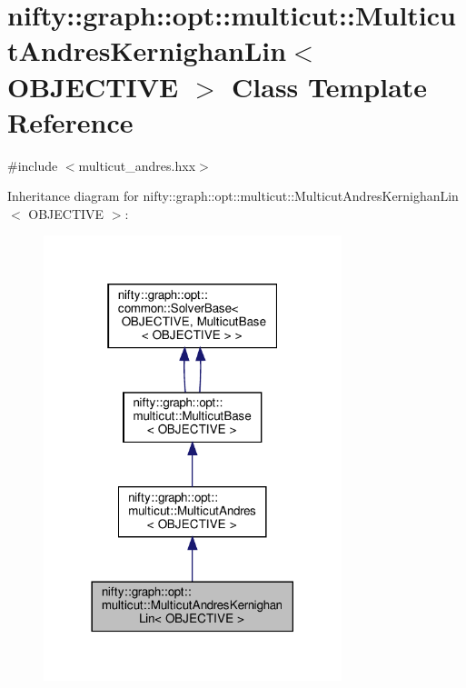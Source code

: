 \hypertarget{classnifty_1_1graph_1_1opt_1_1multicut_1_1MulticutAndresKernighanLin}{}\section{nifty\+:\+:graph\+:\+:opt\+:\+:multicut\+:\+:Multicut\+Andres\+Kernighan\+Lin$<$ O\+B\+J\+E\+C\+T\+I\+VE $>$ Class Template Reference}
\label{classnifty_1_1graph_1_1opt_1_1multicut_1_1MulticutAndresKernighanLin}


{\ttfamily \#include $<$multicut\+\_\+andres.\+hxx$>$}



Inheritance diagram for nifty\+:\+:graph\+:\+:opt\+:\+:multicut\+:\+:Multicut\+Andres\+Kernighan\+Lin$<$ O\+B\+J\+E\+C\+T\+I\+VE $>$\+:
\nopagebreak
\begin{figure}[H]
\begin{center}
\leavevmode
\includegraphics[width=246pt]{classnifty_1_1graph_1_1opt_1_1multicut_1_1MulticutAndresKernighanLin__inherit__graph}
\end{center}
\end{figure}


